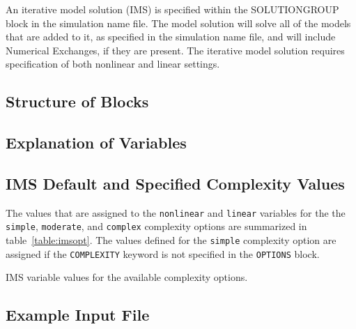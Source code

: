 An iterative model solution (IMS) is specified within the SOLUTIONGROUP block in the simulation name file.  The model solution will solve all of the models that are added to it, as specified in the simulation name file, and will include Numerical Exchanges, if they are present.  The iterative model solution requires specification of both nonlinear and linear settings.  

\vspace{5mm}
\subsection{Structure of Blocks}




\vspace{5mm}
\subsection{Explanation of Variables}
\begin{description}

\end{description}

\subsection{IMS Default and Specified Complexity Values}

The values that are assigned to the \texttt{nonlinear} and \texttt{linear} variables for the the \texttt{simple}, \texttt{moderate}, and \texttt{complex} complexity options are summarized in table~\ref{table:imsopt}. The values defined for the \texttt{simple} complexity option are assigned if the \texttt{COMPLEXITY} keyword is not specified in the \texttt{OPTIONS} block.

\begin{table}[H]
	\caption{IMS variable values for the available complexity options.}
	
	\label{table:imsopt}
\end{table}

\vspace{5mm}
\subsection{Example Input File}


